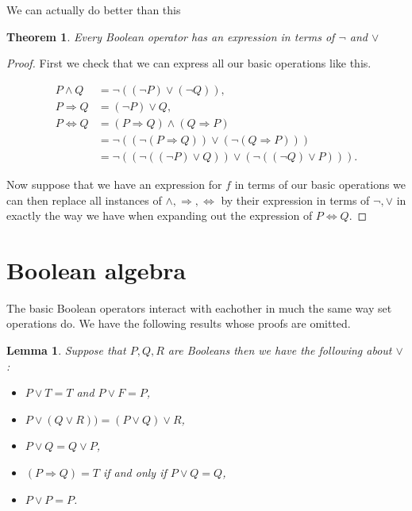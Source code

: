 \documentclass[
]{book}
\newtheorem{theorem}{Theorem}[chapter]
\newtheorem{lemma}{Lemma}[chapter]
\theoremstyle{definition}
\theoremstyle{definition}
\theoremstyle{definition}
\theoremstyle{definition}
\theoremstyle{remark}
\begin{document}
We can actually do better than this

\begin{theorem}
Every Boolean operator has an expression in terms of \(\neg\) and \(\vee\)
\end{theorem}

\begin{proof}
First we check that we can express all our basic operations like this.

\begin{align*}
P \wedge Q &= \neg ( (\neg P) \vee (\neg Q)),\\
P \Rightarrow Q &= (\neg P) \vee Q, \\
P \Leftrightarrow Q &= (P \Rightarrow Q) \wedge (Q \Rightarrow P)\\
&= \neg ( (\neg(P \Rightarrow Q)) \vee (\neg(Q \Rightarrow P))) \\
& = \neg ((\neg((\neg P) \vee Q)) \vee (\neg ((\neg Q) \vee P))).
\end{align*}

Now suppose that we have an expression for \(f\) in terms of our basic operations we can then replace all instances of \(\wedge, \Rightarrow, \Leftrightarrow\) by their expression in terms of \(\neg, \vee\) in exactly the way we have when expanding out the expression of \(P \Leftrightarrow Q\).
\end{proof}

\section{Boolean algebra}\label{boolean-algebra}

The basic Boolean operators interact with eachother in much the same way set operations do. We have the following results whose proofs are omitted.

\begin{lemma}

Suppose that \(P, Q, R\) are Booleans then we have the following about \(\vee\):

\begin{itemize}
\item
  \(P \vee T = T\) and \(P \vee F = P\),
\item
  \(P \vee (Q \vee R)) =(P\vee Q) \vee R\),
\item
  \(P \vee Q = Q \vee P\),
\item
  \((P \Rightarrow Q) = T\) if and only if \(P \vee Q = Q\),
\item
  \(P \vee P = P\).
\end{itemize}

\end{lemma}
\end{document}
